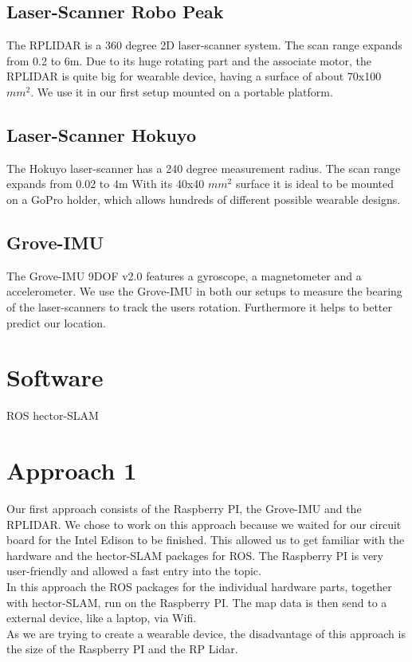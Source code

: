 \documentclass{sigchi-ext}
\begin{document}
\subsection{Laser-Scanner Robo Peak}
The RPLIDAR is a 360 degree 2D laser-scanner system. The scan range expands from 0.2 to 6m. Due to its huge rotating part and the associate motor, the RPLIDAR is quite big for wearable device, having a surface of about 70x100 $mm^2$. We use it in our first setup mounted on a portable platform.
\subsection{Laser-Scanner Hokuyo}
The Hokuyo laser-scanner has a 240 degree measurement radius. The scan range expands from 0.02 to 4m With its 40x40 $mm^2$ surface it is ideal to be mounted on a GoPro holder, which allows hundreds of different possible wearable designs.
\subsection{Grove-IMU}
The Grove-IMU 9DOF v2.0 features a gyroscope, a magnetometer and a accelerometer. We use the Grove-IMU in both our setups to measure the bearing of the laser-scanners to track the users rotation. Furthermore it helps to better predict our location.
\section{Software}
ROS hector-SLAM
\section{Approach 1}
Our first approach consists of the Raspberry PI, the Grove-IMU and the RPLIDAR. We chose to work on this approach because we waited for our circuit board for the Intel Edison to be finished. This allowed us to get familiar with the hardware and the hector-SLAM packages for ROS. The Raspberry PI is very user-friendly and allowed a fast entry into the topic.\\
In this approach the ROS packages for the individual hardware parts, together with hector-SLAM, run on the Raspberry PI. The map data is then send to a external device, like a laptop, via Wifi.\\ 
As we are trying to create a wearable device, the disadvantage of this approach is the size of the Raspberry PI and the RP Lidar.
\end{document}
